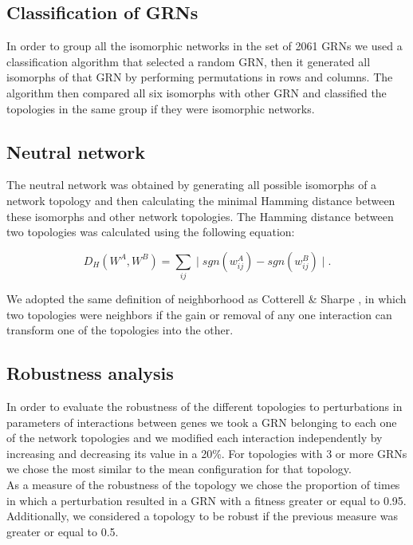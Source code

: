 \documentclass[10pt,letterpaper]{article}
\begin{document}
\subsection*{Classification of GRNs}

In order to group all the isomorphic networks in the set of 2061 GRNs we used a
classification algorithm that selected a random GRN, then it generated all 
isomorphs of that GRN by performing permutations in rows and columns. The 
algorithm then compared all six isomorphs with other GRN and classified the 
topologies in the same group if they were isomorphic networks.

\subsection*{Neutral network}

The neutral network was obtained by generating all possible isomorphs of a 
network topology and then calculating the minimal Hamming distance between these
isomorphs and other network topologies. The Hamming distance between two 
topologies was calculated using the following equation:

\begin{equation}
 D_H(W^A, W^B) = \sum_{ij} \mid sgn(w_{ij}^A) - sgn(w^B_{ij}) \mid .
\end{equation}

We adopted the same definition of neighborhood as Cotterell \& Sharpe 
\cite{Cotterell2010}, in which two topologies were neighbors if the gain or 
removal of any one interaction can transform one of the topologies into the 
other.

\subsection*{Robustness analysis}

In order to evaluate the robustness of the different topologies to perturbations
in parameters of interactions between genes we took a GRN belonging to each one 
of the network topologies and we modified each interaction independently by 
increasing and decreasing its value in a 20\%. For topologies with 3 or more 
GRNs we chose the most similar to the mean configuration for that topology.\\

As a measure of the robustness of the topology we chose the proportion of times 
in which a perturbation resulted in a GRN with a fitness greater or equal to 
0.95. Additionally, we considered a topology to be robust if the previous 
measure was greater or equal to 0.5.\\
\end{document}
